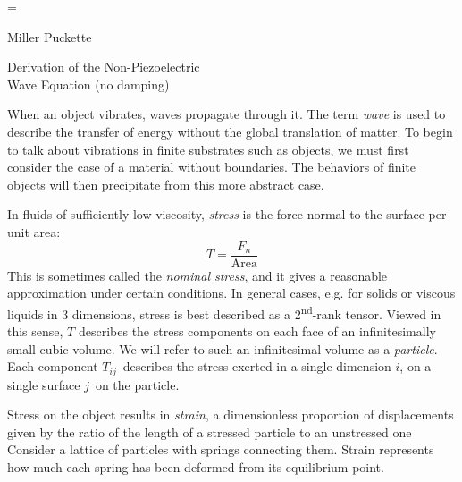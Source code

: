 \documentclass[a4paper,10pt]{report}
\makeatletter
\numberwithin{equation}{section}
\let\realnormalsize=\normalsize
\def\liih@math{\ifmmode$\else\bad@math\fi}
\def\adjustnormalsize{\def\normalsize{\mathsurround=0pt \realnormalsize
 \parindent=0pt\abovedisplayskip=0pt\belowdisplayskip=0pt}%
 \def\phantompar{\csname par\endcsname}\normalsize}%
\newcommand\lthtmlvboxmathA{\adjustnormalsize\setbox\sizebox=\vbox\bgroup %
 \let\ifinner=\iffalse \let\)\liih@math }%
\newcommand\lthtmlmathtype[1]{\gdef\lthtmlmathenv{#1}}%
\newcommand\lthtmlfigureA[1]{\let\@savefreelist\@freelist
       \lthtmlmathtype{#1}\lthtmlvboxmathA}%
\makeatother
\begin{document}
\setcounter{footnote}{0}
{\newpage\clearpage
\lthtmlfigureA{chapter12}%
\begin{chapter}
{Miller Puckette}
\begin{abstract}
If you were trying to measure how a solid object vibrates, the question might be broken down into two sub-questions: how does the object vibrate in general, and what is its specific vibrational state at a given moment in time. What models have you found that might be useful for describing the vibratory behavior in general, and what are the prospects for picking up specific vibrational state information? Is it possible to predict under what conditions it will be possible to make these measurements on real objects, and/or how the number of sensors available might affect the quality of measurements that are possible?
\end{abstract}
\begin{section}{Derivation of the Non-Piezoelectric \\Wave Equation (no damping)}
\par
When an object vibrates, waves propagate through it. The term \emph{wave} is used to describe the transfer of energy without the global translation of matter. To begin to talk about vibrations in finite substrates such as objects, we must first consider the case of a material without boundaries. The behaviors of finite objects will then precipitate from this more abstract case.
\par
In fluids of sufficiently low viscosity, \emph{stress} is the force normal to the surface per unit area:
\begin{equation*}
T = \frac{F_n}{\text{Area}}
\end{equation*}
This is sometimes called the \emph{nominal stress}, and it gives a reasonable
approximation under certain conditions.
In general cases, e.g. for solids or viscous liquids in 3 dimensions, stress is best described as a 2\textsuperscript{nd}-rank tensor. Viewed in this sense, $T$ 
describes the stress components on each face of an infinitesimally small cubic
volume. We will refer to such an infinitesimal volume as a \emph{particle}. Each component $T_{ij}$\  describes the stress exerted in a single dimension $i$, on a single surface $j$\  on the particle. \cite{Ballantine1997, Kino1987}
\par
Stress on the object results in \emph{strain}, a dimensionless proportion of
displacements given by the ratio of the length of a stressed particle to an unstressed one Consider a lattice of particles with springs connecting them. Strain represents how much each spring has been deformed from its equilibrium point.

\end{section}
\end{chapter}}
\end{document}
